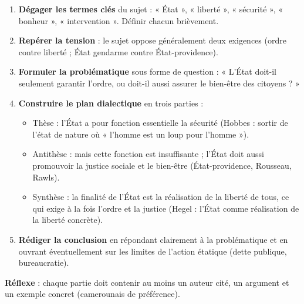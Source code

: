 \documentclass[11pt]{article}
\begin{document}
\begin{methode}
\begin{enumerate}
\item \textbf{Dégager les termes clés} du sujet : « État », « liberté », « sécurité », « bonheur », « intervention ». Définir chacun brièvement.
\item \textbf{Repérer la tension} : le sujet oppose généralement deux exigences (ordre contre liberté ; État gendarme contre État-providence).
\item \textbf{Formuler la problématique} sous forme de question : « L'État doit-il seulement garantir l'ordre, ou doit-il aussi assurer le bien-être des citoyens ? »
\item \textbf{Construire le plan dialectique} en trois parties :
\begin{itemize}
\item Thèse : l'État a pour fonction essentielle la sécurité (Hobbes : sortir de l'état de nature où « l'homme est un loup pour l'homme »).
\item Antithèse : mais cette fonction est insuffisante ; l'État doit aussi promouvoir la justice sociale et le bien-être (État-providence, Rousseau, Rawls).
\item Synthèse : la finalité de l'État est la réalisation de la liberté de tous, ce qui exige à la fois l'ordre et la justice (Hegel : l'État comme réalisation de la liberté concrète).
\end{itemize}
\item \textbf{Rédiger la conclusion} en répondant clairement à la problématique et en ouvrant éventuellement sur les limites de l'action étatique (dette publique, bureaucratie).
\end{enumerate}
\textbf{Réflexe} : chaque partie doit contenir au moins un auteur cité, un argument et un exemple concret (camerounais de préférence).
\end{methode}
\end{document}
